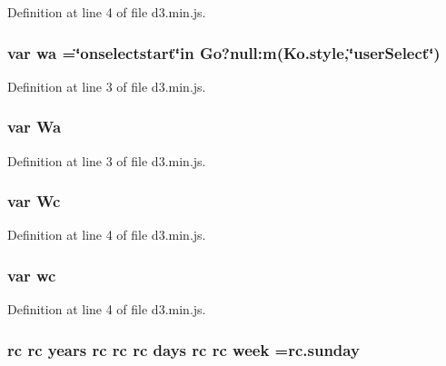 Definition at line 4 of file d3.\+min.\+js.

\subsubsection[{wa}]{\setlength{\rightskip}{0pt plus 5cm}var wa =\char`\"{}onselectstart\char`\"{}in {\bf Go}?null\+:m({\bf Ko.\+style},\char`\"{}user\+Select\char`\"{})}\label{d3_8min_8js_aa8ea4528ceda2044f1718cd43b86b72e}


Definition at line 3 of file d3.\+min.\+js.

\subsubsection[{Wa}]{\setlength{\rightskip}{0pt plus 5cm}var Wa}\label{d3_8min_8js_a141ccd2c5ccfb5bfaef64cbb739c60a8}


Definition at line 3 of file d3.\+min.\+js.

\subsubsection[{Wc}]{\setlength{\rightskip}{0pt plus 5cm}var Wc}\label{d3_8min_8js_a0173ebd8f7d804c00ca179722bb15cae}


Definition at line 4 of file d3.\+min.\+js.

\subsubsection[{wc}]{\setlength{\rightskip}{0pt plus 5cm}var wc}\label{d3_8min_8js_a8e0672deac3b4784f2a0e9320b25f3f4}


Definition at line 4 of file d3.\+min.\+js.

\subsubsection[{week}]{ {\bf rc} {\bf rc} {\bf years} {\bf rc} {\bf rc} {\bf rc} {\bf days} {\bf rc} {\bf rc} week =rc.\+sunday}\label{d3_8min_8js_a5373825586c385496ac142c8b07e8ff6}


